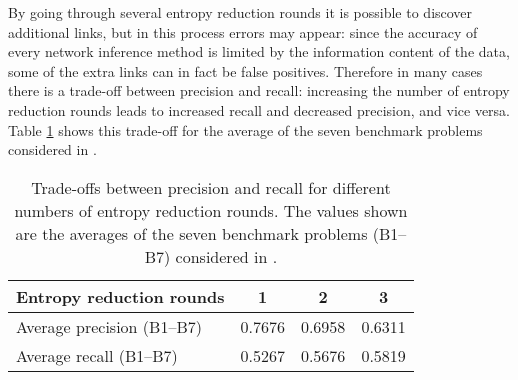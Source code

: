 \documentclass{llncs}
\begin{document}
By going through several entropy reduction rounds it is possible to discover additional links, but in this process errors may appear: since the accuracy of every network inference method is limited by the information content of the data, some of the extra links can in fact be false positives.
Therefore in many cases there is a trade-off between precision and recall: increasing the number of entropy reduction rounds leads to increased recall and decreased precision, and vice versa. 
Table \ref{tradeoffs} shows this trade-off for the average of the seven benchmark problems considered in \cite{villaverde2014mider}. 
\begin{table}[h]
	\caption{Trade-offs between precision and recall for different numbers of entropy reduction rounds. The values shown are the averages of the seven benchmark problems (B1--B7) considered in \cite{villaverde2014mider}.}
	\begin{center}
		\begin{tabular}{lccc}
			\hline
			Entropy reduction rounds   & 1        & 2      & 3      \\
			\hline
			Average precision (B1--B7) & 0.7676   & 0.6958 & 0.6311 \\
			Average recall (B1--B7)    & 0.5267   & 0.5676 & 0.5819 \\
			\hline
		\end{tabular}
		\label{tradeoffs}
	\end{center}
\end{table}
\end{document}
